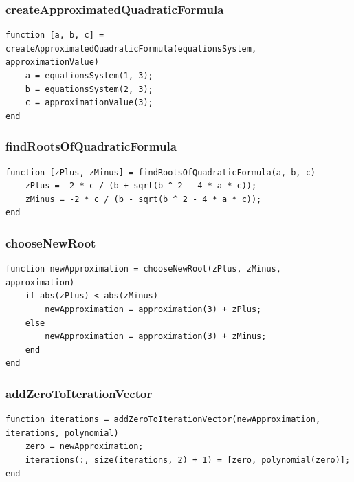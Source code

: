 \newpage
\subsubsection{createApproximatedQuadraticFormula}
\begin{simplechar}
\begin{lstlisting}
function [a, b, c] = createApproximatedQuadraticFormula(equationsSystem, approximationValue)
    a = equationsSystem(1, 3);
    b = equationsSystem(2, 3);
    c = approximationValue(3);
end
\end{lstlisting}
\end{simplechar}

\subsubsection{findRootsOfQuadraticFormula}
\begin{simplechar}
\begin{lstlisting}
function [zPlus, zMinus] = findRootsOfQuadraticFormula(a, b, c)
    zPlus = -2 * c / (b + sqrt(b ^ 2 - 4 * a * c));
    zMinus = -2 * c / (b - sqrt(b ^ 2 - 4 * a * c));
end
\end{lstlisting}
\end{simplechar}

\subsubsection{chooseNewRoot}
\begin{simplechar}
\begin{lstlisting}
function newApproximation = chooseNewRoot(zPlus, zMinus, approximation)
    if abs(zPlus) < abs(zMinus)
        newApproximation = approximation(3) + zPlus;
    else
        newApproximation = approximation(3) + zMinus;
    end
end
\end{lstlisting}
\end{simplechar}

\subsubsection{addZeroToIterationVector}
\begin{simplechar}
\begin{lstlisting}
function iterations = addZeroToIterationVector(newApproximation, iterations, polynomial)
    zero = newApproximation;
    iterations(:, size(iterations, 2) + 1) = [zero, polynomial(zero)];
end
\end{lstlisting}
\end{simplechar}

